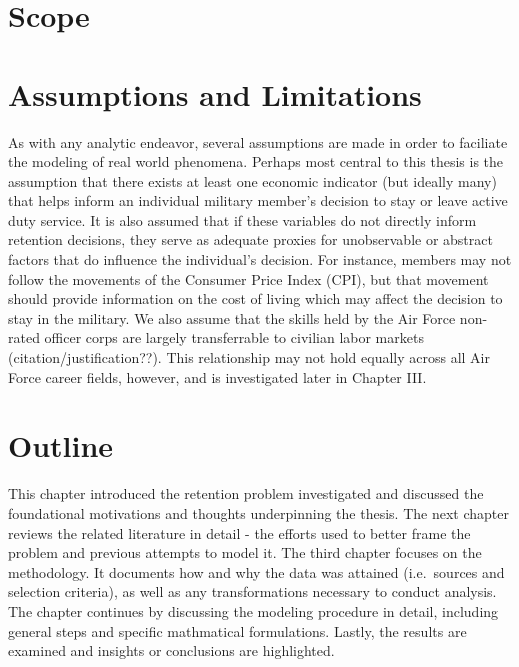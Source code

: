 \documentclass[12pt,letterpaper,toc=flat,oneside]{report}
\theoremstyle{definition}
\theoremstyle{definition}
\theoremstyle{definition}
\theoremstyle{remark}
\begin{document}
\hypertarget{scope}{%
\section{Scope}\label{scope}}

\hypertarget{assumptions-and-limitations}{%
\section{Assumptions and
Limitations}\label{assumptions-and-limitations}}

As with any analytic endeavor, several assumptions are made in order to
faciliate the modeling of real world phenomena. Perhaps most central to
this thesis is the assumption that there exists at least one economic
indicator (but ideally many) that helps inform an individual military
member's decision to stay or leave active duty service. It is also
assumed that if these variables do not directly inform retention
decisions, they serve as adequate proxies for unobservable or abstract
factors that do influence the individual's decision. For instance,
members may not follow the movements of the Consumer Price Index (CPI),
but that movement should provide information on the cost of living which
may affect the decision to stay in the military. We also assume that the
skills held by the Air Force non-rated officer corps are largely
transferrable to civilian labor markets (citation/justification??). This
relationship may not hold equally across all Air Force career fields,
however, and is investigated later in Chapter III.

\hypertarget{outline}{%
\section{Outline}\label{outline}}

This chapter introduced the retention problem investigated and discussed
the foundational motivations and thoughts underpinning the thesis. The
next chapter reviews the related literature in detail - the efforts used
to better frame the problem and previous attempts to model it. The third
chapter focuses on the methodology. It documents how and why the data
was attained (i.e.~sources and selection criteria), as well as any
transformations necessary to conduct analysis. The chapter continues by
discussing the modeling procedure in detail, including general steps and
specific mathmatical formulations. Lastly, the results are examined and
insights or conclusions are highlighted.
\end{document}
